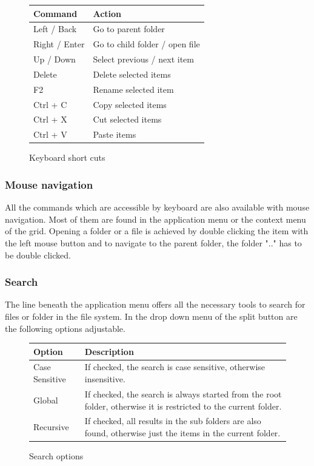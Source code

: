 \documentclass[a4paper,12pt]{article}
\begin{document}
\begin{figure}[h!]
	\centering
	\begin{tabular}{| l | l |}
		\hline
		\textbf{Command} & \textbf{Action} \\ \hline \hline
		Left / Back & Go to parent folder \\ \hline
		Right / Enter & Go to child folder / open file \\ \hline
		Up / Down & Select previous / next item \\ \hline
		Delete & Delete selected items \\ \hline
		F2 & Rename selected item \\ \hline
		Ctrl + C & Copy selected items \\ \hline
		Ctrl + X & Cut selected items \\ \hline
		Ctrl + V & Paste items \\ \hline	
	\end{tabular}
	\caption{Keyboard short cuts}
\end{figure}

\subsubsection{Mouse navigation}
All the commands which are accessible by keyboard are also available with mouse navigation.
Most of them are found in the application menu or the context menu of the grid. Opening a folder or a file is achieved by double clicking the item with the left mouse button and to navigate to the parent folder, the folder ".." has to be double clicked. 

\subsubsection{Search}	
The line beneath the application menu offers all the necessary tools to search for files or folder in the file system. In the drop down menu of the split button are the following options adjustable.
\begin{figure}[h!]
	\centering
	\begin{tabular}{| l | p{10cm} |}
		\hline
		\textbf{Option} & \textbf{Description} \\ \hline \hline
		Case Sensitive & If checked, the search is case sensitive, otherwise insensitive. \\ \hline
		Global & If checked, the search is always started from the root folder, otherwise it is restricted to the current folder. \\ \hline
		Recursive & If checked, all results in the sub folders are also found, otherwise just the items in the current folder. \\ \hline
		\end{tabular}
	\caption{Search options}
\end{figure}
\end{document}
